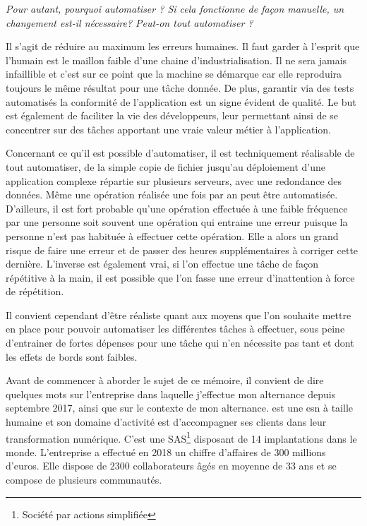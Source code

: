 \emph{Pour autant, pourquoi automatiser ? Si cela fonctionne de façon manuelle, un changement est-il nécessaire? Peut-on tout automatiser ?}

Il s'agit de réduire au maximum les erreurs humaines. Il faut garder à l'esprit que l'humain est le maillon faible d'une chaine d'industrialisation. Il ne sera jamais infaillible et c'est sur ce point que la machine se démarque car elle reproduira toujours le même résultat pour une tâche donnée. De plus, garantir via des tests automatisés la conformité de l'application est un signe évident de qualité. Le but est également de faciliter la vie des développeurs, leur permettant ainsi de se concentrer sur des tâches apportant une vraie valeur métier à l'application.

Concernant ce qu'il est possible d'automatiser, il est techniquement réalisable de tout automatiser, de la simple copie de fichier jusqu'au déploiement d'une application complexe répartie sur plusieurs serveurs, avec une redondance des données. Même une opération réalisée une fois par an peut être automatisée. D'ailleurs, il est fort probable qu'une opération effectuée à une faible fréquence par une personne soit souvent une opération qui entraine une erreur puisque la personne n'est pas habituée à effectuer cette opération. Elle a alors un grand risque de faire une erreur et de passer des heures supplémentaires à corriger cette dernière. L'inverse est également vrai, si l'on effectue une tâche de façon répétitive à la main, il est possible que l'on fasse une erreur d'inattention à force de répétition. 

Il convient cependant d'être réaliste quant aux moyens que l'on souhaite mettre en place pour pouvoir automatiser les différentes tâches à effectuer, sous peine d'entrainer de fortes dépenses pour une tâche qui n'en nécessite pas tant et dont les effets de bords sont faibles.

Avant de commencer à aborder le sujet de ce mémoire, il convient de dire quelques mots sur l'entreprise dans laquelle j'effectue mon alternance depuis septembre 2017, \onepoint{} ainsi que sur le contexte de mon alternance. \xmakefirstuc{\onepoint{}} est une \gls{esn} à taille humaine et son domaine d'activité est d'accompagner ses clients dans leur transformation numérique. C'est une SAS\footnote{Société par actions simplifiée} disposant de 14 implantations dans le monde. L'entreprise a effectué en 2018 un chiffre d'affaires de 300 millions d'euros. Elle dispose de 2300 collaborateurs âgés en moyenne de 33 ans et se compose de plusieurs communautés.

